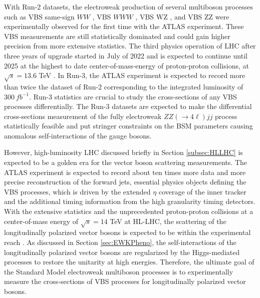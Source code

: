 With Run-2 datasets, the electroweak production of several multiboson processes such as VBS same-sign $WW$ \cite{EWk_ssWW}, VBS $WWW$ \cite{EWK_WWW}, VBS WZ \cite{EWK_WZ}, and VBS ZZ \cite{ATLASZZjj} were experimentally observed for the first time with the ATLAS experiment. These VBS measurements are still statistically dominated and could gain higher precision from more extensive statistics. The third physics operation of LHC after three years of upgrade started in July of 2022 and is expected to continue until 2025 at the highest to date center-of-mass-energy of proton-proton collisions, at $\sqrt{s}=13.6$ TeV \cite{Run3}. In Run-3, the ATLAS experiment is expected to record more than twice the dataset of Run-2 corresponding to the integrated luminosity of $300 ~fb^{-1}$. Run-3 statistics are crucial to study the cross-sections of any VBS processes differentially. The Run-3 datasets are expected to make the differential cross-sections measurement of the fully electroweak $ZZ(\rightarrow 4\ell) jj$ process statistically feasible and put stringer constraints on the BSM parameters causing anomalous self-interactions of the gauge bosons. 

However, high-luminosity LHC discussed briefly in Section \ref{subsec:HLLHC} is expected to be a golden era for the vector boson scattering measurements. The ATLAS experiment is expected to record about ten times more data and more precise reconstruction of the forward jets, essential physics objects defining the VBS processes, which is driven by the extended $\eta$ coverage of the inner tracker and the additional timing information from the high granularity timing detectors. With the extensive statistics and the unprecedented proton-proton collisions at a center-of-mass energy of $\sqrt{s}=14$ TeV at HL-LHC, the scattering of the longitudinally polarized vector bosons is expected to be within the experimental reach \cite{ssWW_HLLHCProspects}. As discussed in Section \ref{sec:EWKPheno}, the self-interactions of the longitudinally polarized vector bosons are regularized by the Higgs-mediated processes to restore the unitarity at high energies. Therefore, the ultimate goal of the Standard Model electroweak multiboson processes is to experimentally measure the cross-sections of VBS processes for longitudinally polarized vector bosons.